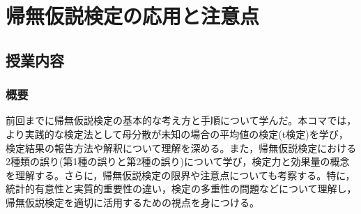 \section{帰無仮説検定の応用と注意点}
\label{b14_NHST2}

\subsection{授業内容}
\subsubsection{概要}
前回までに帰無仮説検定の基本的な考え方と手順について学んだ。本コマでは，より実践的な検定法として母分散が未知の場合の平均値の検定(t検定)を学び，検定結果の報告方法や解釈について理解を深める。また，帰無仮説検定における2種類の誤り(第1種の誤りと第2種の誤り)について学び，検定力と効果量の概念を理解する。さらに，帰無仮説検定の限界や注意点についても考察する。特に，統計的有意性と実質的重要性の違い，検定の多重性の問題などについて理解し，帰無仮説検定を適切に活用するための視点を身につける。


